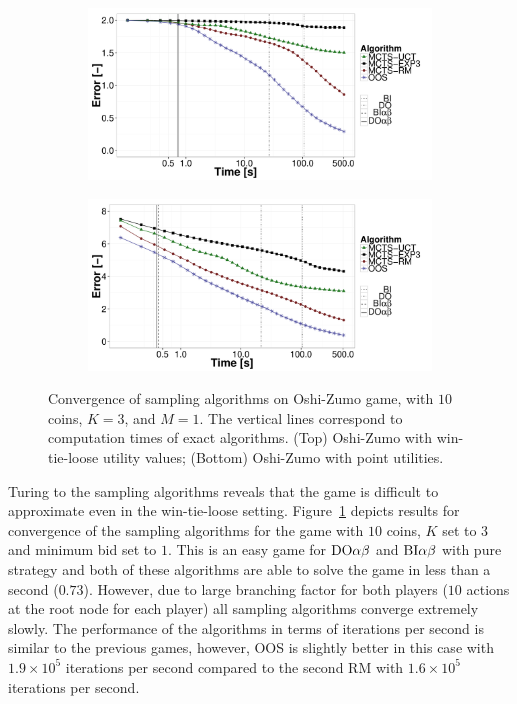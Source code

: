 \begin{figure}[t]
\centering
	\begin{subfigure}{0.85\textwidth}
		\includegraphics[width=1\textwidth]{figures/convergence-oz.pdf}
	\end{subfigure}
	\begin{subfigure}{0.85\textwidth}
		\includegraphics[width=1\textwidth]{figures/convergence-oz-bf.pdf}
	\end{subfigure}
\caption{Convergence of sampling algorithms on Oshi-Zumo game, with $10$ coins, $K=3$, and $M=1$. The vertical lines correspond to computation times of exact algorithms.
(Top) Oshi-Zumo with win-tie-loose utility values; 
(Bottom) Oshi-Zumo with point utilities.} \label{fig:off:conv:oz}
\end{figure}

Turing to the sampling algorithms reveals that the game is difficult to approximate even in the win-tie-loose setting.
Figure~\ref{fig:off:conv:oz} depicts results for convergence of the sampling algorithms for the game with $10$ coins, $K$ set to $3$ and minimum bid set to $1$. This is an easy game for $\textrm{DO}\alpha\beta$ and $\textrm{BI}\alpha\beta$ with pure strategy and both of these algorithms are able to solve the game in less than a second ($0.73$). However, due to large branching factor for both players ($10$ actions at the root node for each player) all sampling algorithms converge extremely slowly. The performance of the algorithms in terms of iterations per second is similar to the previous games, however, OOS is slightly better in this case with $1.9\times10^5$ iterations per second compared to the second RM with $1.6\times10^5$ iterations per second.

